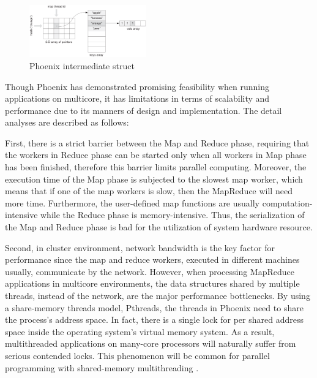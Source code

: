 \begin{figure}[!h!t]  
    \centering
    \includegraphics[width=0.45\textwidth]{eps/phoenix_intermediate.eps}
    \caption{Phoenix intermediate struct}
    \label{fig:phoenix:intermediate}
\end{figure}

Though Phoenix has demonstrated promising feasibility when running  applications on multicore,  it has limitations in terms of scalability and performance due to its manners of design and implementation.
The detail analyses are described as follows:

First, there is a strict barrier between the Map and Reduce phase,
requiring that the workers in Reduce phase can
be started only when all workers in Map phase has been finished, 
therefore this barrier limits parallel computing.
Moreover,  the execution time of the Map phase is subjected to the slowest map worker, which means that if one of the map workers is slow, then the MapReduce will need more time.
Furthermore, the user-defined map functions are usually computation-intensive while the Reduce phase is memory-intensive. Thus, the serialization of the Map and Reduce phase is bad for the utilization of system hardware resource.

Second,  in cluster environment, network bandwidth is the key factor for performance since the map and reduce workers, executed in different machines usually,  communicate by the network.
However, when processing MapReduce applications in multicore environments,  the data structures shared by multiple threads, instead of the network, are the major performance bottlenecks.
By using  a share-memory threads model, Pthreads,
the threads in Phoenix need to share the process's address space.
In fact, there is a single lock for per shared address space inside the operating system’s virtual memory system. 
As a result, multithreaded applications on many-core processors will naturally suffer from serious contended locks.
This phenomenon will be common for parallel programming with shared-memory
multithreading \cite{clements2013radixvm}.

